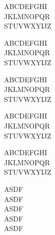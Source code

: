 \documentclass{memoir}
\begin{document}
\begin{multicols}{2}
{\Large
\noindent ABCDEFGHI\\
JKLMNOPQR\\
STUVWXYĲZ\\}

{\LARGE
\noindent ABCDEFGHI\\
JKLMNOPQR\\
STUVWXYĲZ\\}

{\huge
\noindent ABCDEFGHI\\
JKLMNOPQR\\
STUVWXYĲZ\\}

{\Huge
\noindent ABCDEFGHI\\
JKLMNOPQR\\
STUVWXYĲZ\\}

{\HUGE
\noindent ABCDEFGHI\\
JKLMNOPQR\\
STUVWXYĲZ\\}

\noindent ASDF\\
{ASDF}\\

\noindent ASDF\\
{ASDF}\\
{ASDF}\\


\end{multicols}
\end{document}
